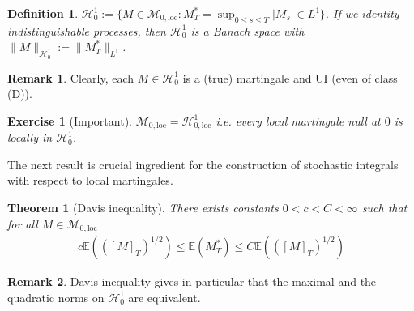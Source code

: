 \documentclass[12pt,a4paper, twoside]{article}
\newtheorem{thm}{Theorem}[section]
\newtheorem{defn}{Definition}[section]
\newtheorem{exe}{Exercise}[section]
\theoremstyle{definition}
\newtheorem{rem}{Remark}[section]
\newcommand{\EE}{\mathbb{E}} %
\begin{document}
\newpage
\begin{defn} $\mathcal{H}_0^1:= \{ M \in \mathcal{M}_{0, \text{loc}} : M_T^* = \sup_{0 \leq s \leq T} |M_s| \in L^1\}.$ If we identity indistinguishable processes, then $\mathcal{H}_0^1$ is a Banach space with $\|M\|_{\mathcal{H}_0^1} := \| M_T^*\|_{L^1}$. 
\end{defn}
\begin{rem} Clearly, each $M \in \mathcal{H}_0^1$ is a (true) martingale and UI (even of class (D)). 
\end{rem}
\begin{exe}[Important] $\mathcal{M}_{0, \text{loc}} = \mathcal{H}_{0, \text{loc}}^1$ i.e. every local martingale null at $0$ is locally in $\mathcal{H}_0^1$. 
\end{exe}
The next result is crucial ingredient for the construction of stochastic integrals with respect to local martingales. 
\begin{thm}[Davis inequality] \label{T37} There exists constants $0 <c<C < \infty$ such that for all $M \in \mathcal{M}_{0, \text{loc}}$ 
\begin{align*}
c \EE(([M]_T)^{1/2})  \leq \EE(M_T^*) \leq C \EE(([M]_T)^{1/2})
\end{align*}
\end{thm}
\begin{rem} Davis inequality gives in particular that the maximal and the quadratic norms on $\mathcal{H}_0^1$ are equivalent.
\end{rem}
\end{document}
